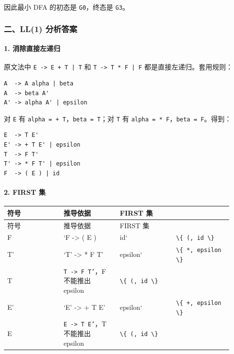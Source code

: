 \documentclass[UTF8]{ctexart}
\begin{document}
因此最小 DFA 的初态是 \texttt{G0}，终态是 \texttt{G3}。

\subsubsection*{二、LL(1) 分析答案}

\paragraph*{1. 消除直接左递归}

原文法中 \texttt{E -> E + T | T} 和 \texttt{T -> T * F | F} 都是直接左递归。套用规则：

\begin{Verbatim}[fontsize=\small,breaklines=true]
A  -> A alpha | beta
A  -> beta A'
A' -> alpha A' | epsilon
\end{Verbatim}

对 \texttt{E} 有 \texttt{alpha = + T}，\texttt{beta = T}；对 \texttt{T} 有 \texttt{alpha = * F}，\texttt{beta = F}。得到：

\begin{Verbatim}[fontsize=\small,breaklines=true]
E  -> T E'
E' -> + T E' | epsilon
T  -> F T'
T' -> * F T' | epsilon
F  -> ( E ) | id
\end{Verbatim}

\paragraph*{2. FIRST 集}

\begin{longtable}{|p{0.23\linewidth}|p{0.23\linewidth}|p{0.23\linewidth}|p{0.23\linewidth}|}
\hline
符号 & 推导依据 & FIRST 集 &  \\
\hline
\endfirsthead
符号 & 推导依据 & FIRST 集 &  \\
\hline
\endhead
F & `F -> ( E ) & id` & \texttt{\textbackslash{}\{ (, id \textbackslash{}\}} \\
\hline
T' & `T' -> * F T' & epsilon` & \texttt{\textbackslash{}\{ *, epsilon \textbackslash{}\}} \\
\hline
T & \texttt{T -> F T'}，F 不能推出 epsilon & \texttt{\textbackslash{}\{ (, id \textbackslash{}\}} &  \\
\hline
E' & `E' -> + T E' & epsilon` & \texttt{\textbackslash{}\{ +, epsilon \textbackslash{}\}} \\
\hline
E & \texttt{E -> T E'}，T 不能推出 epsilon & \texttt{\textbackslash{}\{ (, id \textbackslash{}\}} &  \\
\hline
\end{longtable}
\end{document}
